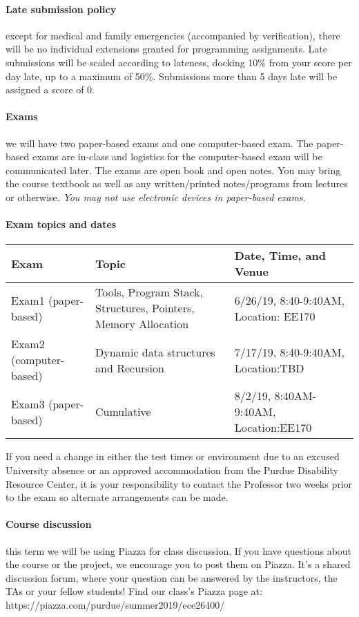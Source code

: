 \documentclass{article}
\begin{document}
\paragraph{Late submission policy} except for medical and family emergencies (accompanied by verification), there will be no individual extensions granted for programming assignments. Late submissions will be scaled according to lateness, docking 10\% from your score per day late, up to a maximum of 50\%. Submissions more than 5 days late will be assigned a score of 0.

\paragraph{Exams} we will have two paper-based exams and one computer-based exam. The paper-based exams are in-class and logistics for the computer-based exam will be communicated later.
The exams are open book and open notes. You may bring the course textbook as well as any written/printed notes/programs from lectures or otherwise. {\em You may not use electronic devices in paper-based exams}.

\paragraph{Exam topics and dates}
\begin{table}[H]
\centering
\begin{tabulary}{\linewidth}{|l|p{70mm}|p{40mm}|}\hline
Exam & Topic & Date, Time, and Venue \\ \hline
Exam1 (paper-based) & Tools, Program Stack, Structures, Pointers, Memory Allocation &  6/26/19, 8:40-9:40AM, Location: EE170 \\ \hline
Exam2 (computer-based) & Dynamic data structures and Recursion & 7/17/19, 8:40-9:40AM, Location:TBD \\ \hline
Exam3 (paper-based) & Cumulative & 8/2/19, 8:40AM-9:40AM, Location:EE170 \\
\hline
\end{tabulary}
\end{table}

If you need a change in either the test times or environment due to an excused University absence or an approved accommodation from the Purdue Disability Resource Center, it is your responsibility to contact the Professor two weeks prior to the exam so alternate arrangements can be made. 

\paragraph{Course discussion} this term we will be using Piazza for class discussion. If you have questions about the course or the project, we encourage you to post them on Piazza. It's a shared discussion forum, where your question can be answered by the instructors, the TAs or your fellow students! Find our class's Piazza page at: https://piazza.com/purdue/summer2019/ece26400/
\end{document}
